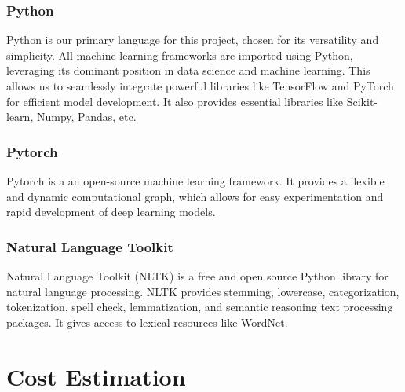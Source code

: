     \subsubsection*{Python} 
    Python is our primary language for this project, chosen for its versatility and simplicity. All machine learning frameworks are imported using Python, leveraging its dominant position in data science and machine learning. This allows us to seamlessly integrate powerful libraries like TensorFlow and PyTorch for efficient model development. It also provides essential libraries like Scikit-learn, Numpy, Pandas, etc.

    \subsubsection*{Pytorch}
    Pytorch is a an open-source machine learning framework. It provides a flexible and dynamic computational graph, which allows for easy experimentation and rapid development of deep learning models. 

    \subsubsection*{Natural Language Toolkit}
    Natural Language Toolkit (NLTK) is a free and open source Python library for natural language processing. NLTK provides stemming, lowercase, categorization, tokenization, spell check, lemmatization, and semantic reasoning text processing packages. It gives access to lexical resources like WordNet.

\section{Cost Estimation}

